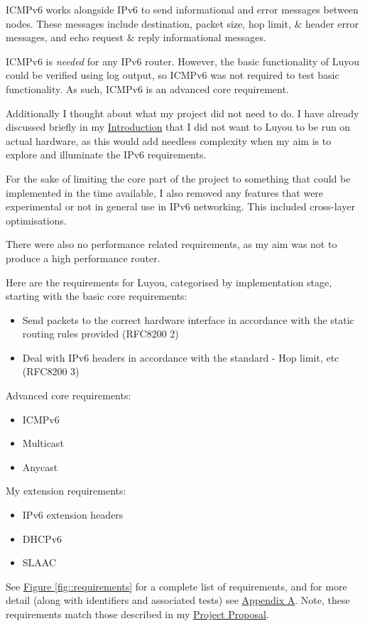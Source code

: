 \documentclass[12pt,a4paper,twoside,openright]{report}
\begin{document}
\bigskip

ICMPv6 works alongside IPv6 to send informational and error messages between nodes.  These messages include destination, packet size, hop limit, \& header error messages, and echo request \& reply informational messages. 

ICMPv6 is \textit{needed} for any IPv6 router.  However, the basic functionality of Luyou could be verified using log output, so ICMPv6 was not required to test basic functionality. As such, ICMPv6 is an advanced core requirement.

\bigskip

Additionally I thought about what my project did not need to do. I have already discussed briefly in my \hyperref[chap::introduction]{Introduction} that I did not want to Luyou to be run on actual hardware, as this would add needless complexity when my aim is to explore and illuminate the IPv6 requirements. 

For the sake of limiting the core part of the project to something that could be implemented in the time available, I also removed any features that were experimental or not in general use in IPv6 networking.  This included cross-layer optimisations.

There were also no performance related requirements, as my aim was not to produce a high performance router.

\bigskip

Here are the requirements for Luyou, categorised by implementation stage, starting with the basic core requirements:
\begin{itemize}
\item Send packets to the correct hardware interface in accordance with the static routing rules provided (RFC8200 2\cite{ipv6_rfc})
\item Deal with IPv6 headers in accordance with the standard - Hop limit, etc (RFC8200 3\cite{ipv6_rfc})
\end{itemize}
Advanced core requirements:
\begin{itemize}
\item ICMPv6\cite{icmpv6_rfc}
\item Multicast\cite{ipv6_rfc_adr}
\item Anycast\cite{ipv6_rfc_adr}
\end{itemize}
My extension requirements:
\begin{itemize}
\item IPv6 extension headers\cite{ipv6_rfc}
\item DHCPv6\cite{dhcpv6_rfc}
\item SLAAC\cite{slaac_rfc}
\end{itemize}
See \hyperref[fig::requirements]{Figure }\ref{fig::requirements} for a complete list of requirements, and for more detail (along with identifiers and associated tests) see \hyperref[appendix::requirements]{Appendix A}. Note, these requirements match those described in my  \hyperref[appendix::proposal]{Project Proposal}.
\end{document}
